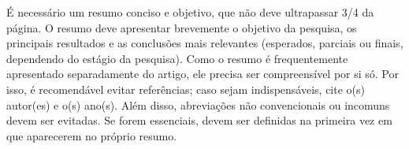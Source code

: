 É necessário um resumo conciso e objetivo, que não deve ultrapassar 3/4 da página. O resumo deve apresentar brevemente o objetivo da pesquisa, os principais resultados e as conclusões mais relevantes (esperados, parciais ou finais, dependendo do estágio da pesquisa). Como o resumo é frequentemente apresentado separadamente do artigo, ele precisa ser compreensível por si só. Por isso, é recomendável evitar referências; caso sejam indispensáveis, cite o(s) autor(es) e o(s) ano(s). Além disso, abreviações não convencionais ou incomuns devem ser evitadas. Se forem essenciais, devem ser definidas na primeira vez em que aparecerem no próprio resumo.